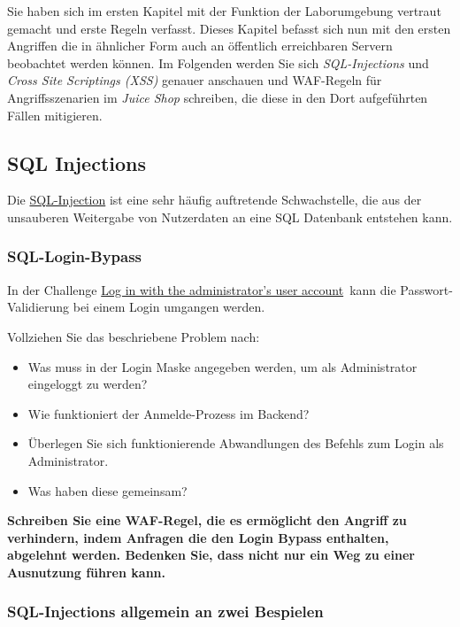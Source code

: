Sie haben sich im ersten Kapitel mit der Funktion der Laborumgebung vertraut gemacht und erste Regeln verfasst.
Dieses Kapitel befasst sich nun mit den ersten Angriffen die in ähnlicher Form auch an öffentlich erreichbaren Servern beobachtet werden können.
Im Folgenden werden Sie sich \textit{SQL-Injections} und \textit{Cross Site Scriptings (XSS)} genauer anschauen und WAF-Regeln für Angriffsszenarien im \textit{Juice Shop} schreiben, die diese in den Dort aufgeführten Fällen mitigieren.

\subsection{SQL Injections}
Die \href{https://portswigger.net/web-security/sql-injection/cheat-sheet}{SQL-Injection} ist eine sehr häufig auftretende Schwachstelle, die aus der unsauberen Weitergabe von Nutzerdaten an eine SQL Datenbank entstehen kann.

\subsubsection{SQL-Login-Bypass}
In der Challenge \glqq\href{https://pwning.owasp-juice.shop/companion-guide/latest/part2/injection.html#_log_in_with_the_administrators_user_account}{Log in with the administrator’s user account}\grqq\ kann die Passwort-Validierung bei einem Login umgangen werden.

Vollziehen Sie das beschriebene Problem nach:
\begin{itemize}
    \item Was muss in der Login Maske angegeben werden, um als Administrator eingeloggt zu werden?
    \item Wie funktioniert der Anmelde-Prozess im Backend?
    \item Überlegen Sie sich funktionierende Abwandlungen des Befehls zum Login als Administrator.
    \item Was haben diese gemeinsam?
\end{itemize}

\textbf{Schreiben Sie eine WAF-Regel, die es ermöglicht den Angriff zu verhindern, indem Anfragen die den Login Bypass enthalten, abgelehnt werden.
Bedenken Sie, dass nicht nur ein Weg zu einer Ausnutzung führen kann.}

\subsubsection{SQL-Injections allgemein an zwei Bespielen}

